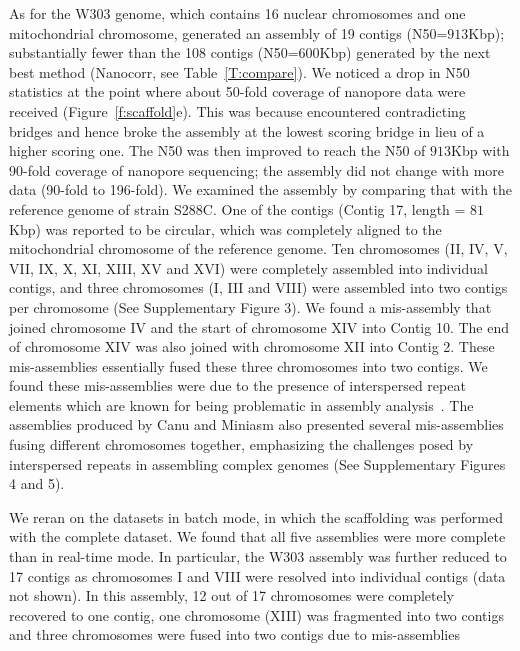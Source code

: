 As for the \sce{} W303 genome, which contains 16 nuclear chromosomes and one 
mitochondrial chromosome, \npscarf{} generated an assembly of 19 contigs (N50=$913$Kbp); 
substantially fewer than 
the 108 contigs (N50=$600$Kbp) generated by the next best method (Nanocorr, 
see Table~\ref{T:compare}).
We noticed a drop in N50 statistics at the point where about 50-fold coverage 
of nanopore data were received (Figure~\ref{f:scaffold}e). This was because
\npscarf{} encountered contradicting bridges and hence broke the assembly at 
the lowest scoring bridge in lieu of a higher scoring one. The N50 was then 
improved to reach the N50 of $913$Kbp with 90-fold coverage of nanopore sequencing; 
the assembly did not change with more data (90-fold to 196-fold). 
We examined the assembly by comparing that with the reference genome of \sce{}
strain S288C. One of the contigs (Contig 17,
length = $81$Kbp) was reported to be circular, which was completely aligned to the 
mitochondrial chromosome of the reference genome. Ten chromosomes (II,
IV, V, VII, IX, X, XI, XIII, XV and XVI) were completely assembled into individual
contigs, and three chromosomes (I, III and VIII) were assembled into two contigs per 
chromosome (See Supplementary Figure 3). We found a mis-assembly that joined
chromosome IV and the start of chromosome XIV into Contig 10. The end of
chromosome XIV was also joined with chromosome XII into Contig 2. These
mis-assemblies essentially fused these three chromosomes into two contigs.
We found these mis-assemblies were due to the presence of interspersed repeat
elements which are known for being problematic in assembly
analysis~\cite{TreangenS2012}. The assemblies produced by Canu and Miniasm also
presented several mis-assemblies fusing different chromosomes together, 
emphasizing the challenges posed by interspersed repeats in assembling complex 
genomes (See Supplementary Figures 4 and 5).


We reran \npscarf{} on the datasets in batch mode, in which the scaffolding was
performed with the complete dataset. We found that all five assemblies were  
more complete than in real-time mode. In particular, the \sce{} W303
assembly was further reduced to 17 contigs as chromosomes I and VIII were 
resolved into individual contigs (data not shown). In this assembly, 12 out of
17 chromosomes were completely recovered to one contig, one chromosome (XIII)
was fragmented into two contigs and three chromosomes were fused into two
contigs due to mis-assemblies


